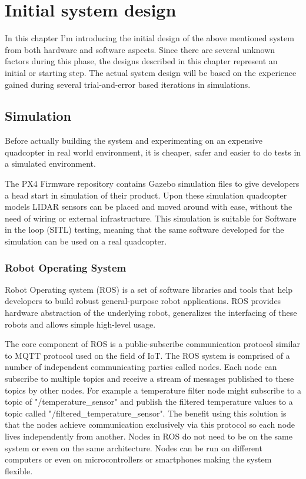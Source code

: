 \chapter{Initial system design}
In this chapter I'm introducing the initial design of the above mentioned system from both hardware and
software aspects. Since there are several unknown factors 
during this phase, the designs described in this chapter represent an initial or starting step. The actual
system design will be based on the experience gained during several trial-and-error based iterations
in simulations.



\section{Simulation}
Before actually building the system and experimenting on an expensive quadcopter in real world environment,
it is cheaper, safer and easier to do tests in a simulated environment. 

The PX4 Firmware repository\cite{PX4Repository} contains Gazebo simulation files to give developers a head 
start in simulation of their product. Upon these simulation quadcopter models LIDAR sensors can be placed and 
moved around with ease, without the need of wiring or external infrastructure. This simulation is 
suitable for Software in the loop (SITL) testing, meaning that the same software developed for the simulation
can be used on a real quadcopter.



\subsection{Robot Operating System}
Robot Operating system (ROS) is a set of software libraries and tools that help developers to build robust 
general-purpose robot applications\cite{ROSWebsite}. ROS provides hardware abstraction of the underlying 
robot, generalizes the interfacing of these robots and allows simple high-level usage.


The core component of ROS is a public-subscribe communication protocol similar to MQTT protocol
used on the field of IoT. The ROS system is comprised of a number of independent communicating parties called 
nodes. Each node can subscribe to multiple topics and receive a stream of messages published to these topics 
by other nodes. For example a temperature filter node might subscribe to a topic of "/temperature\_sensor" 
and publish the filtered temperature values to a topic called "/filtered\_temperature\_sensor". 
The benefit using this solution is that the nodes achieve communication exclusively via this protocol 
so each node lives independently from another. Nodes in ROS do not need to be on the same system or 
even on the same architecture. Nodes can be run on different computers or even on microcontrollers or 
smartphones making the system flexible.

